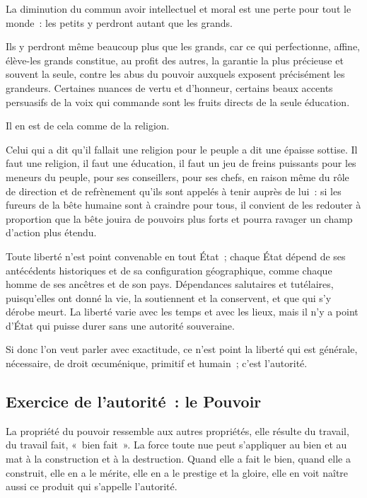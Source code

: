 \documentclass[french,twoside]{book} %
\newcommand{\astermono}{\medskip\centerline{\color{rubric}\large\selectfont{\syms ✻}}\medskip\par}%
\begin{document}
\noindent La diminution du commun avoir intellectuel et moral est une perte pour tout le monde : les petits y perdront autant que les grands.\par
Ils y perdront même beaucoup plus que les grands, car ce qui perfectionne, affine, élève-les grands constitue, au profit des autres, la garantie la plus précieuse et souvent la seule, contre les abus du pouvoir auxquels exposent précisément les grandeurs. Certaines nuances de vertu et d’honneur, certains beaux accents persuasifs de la voix qui commande sont les fruits directs de la seule éducation.\par
Il en est de cela comme de la religion.\par
Celui qui a dit qu’il fallait une religion pour le peuple a dit une épaisse sottise. Il faut une religion, il faut une éducation, il faut un jeu de freins puissants pour les meneurs du peuple, pour ses conseillers, pour ses chefs, en raison même du rôle de direction et de refrènement qu’ils sont appelés à tenir auprès de lui : si les fureurs de la bête humaine sont à craindre pour tous, il convient de les redouter à proportion que la bête jouira de pouvoirs plus forts et pourra ravager un champ d’action plus étendu.\par

\astermono

\noindent Toute liberté n’est point convenable en tout État ; chaque État dépend de ses antécédents historiques et de sa configuration géographique, comme chaque homme de ses ancêtres et de son pays. Dépendances salutaires et tutélaires, puisqu’elles ont donné la vie, la soutiennent et la conservent, et que qui s’y dérobe meurt. La liberté varie avec les temps et avec les lieux, mais il n’y a point d’État qui puisse durer sans une autorité souveraine.\par
Si donc l’on veut parler avec exactitude, ce n’est point la liberté qui est générale, nécessaire, de droit œcuménique, primitif et humain ; c’est l’autorité.\par

\astermono

\subsection[Exercice de l’autorité : le Pouvoir]{Exercice de l’autorité : le Pouvoir}
\noindent La propriété du pouvoir ressemble aux autres propriétés, elle résulte du travail, du travail fait, « bien fait ». La force toute nue peut s’appliquer au bien et au mat à la construction et à la destruction. Quand elle a fait le bien, quand elle a construit, elle en a le mérite, elle en a le prestige et la gloire, elle en voit naître aussi ce produit qui s’appelle l’autorité.\par
\end{document}
